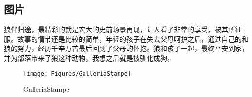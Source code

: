 \documentclass[
    UTF8,
    11pt,
    oneside,
    headinclude,
    footinclude
]{ctexart}
\begin{document}
\subsection{图片}
狼伴归途，最精彩的就是宏大的史前场景再现，让人看了非常的享受，被其所征服。故事的情节还是比较的简单，年轻的孩子在失去父母呵护之后，通过自己的和狼的努力，经历千辛万苦最后回到了父母的怀抱。狼和孩子一起，最终平安到家，并为部落带来了狼这种动物，我想之后就是被驯化成狗。

\begin{figure}[h]
    \centering
    \texttt{[image: Figures/GalleriaStampe]}   %
    \caption{GalleriaStampe}
    \label{woGalleriaStampelf}
\end{figure}
\end{document}
